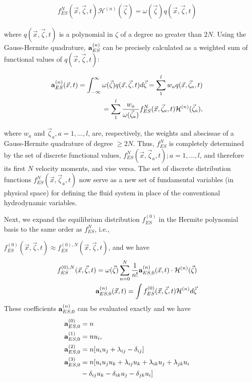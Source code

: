 \documentclass[doublecol]{epl2}
\begin{document}
\begin{align}
 f^N_{ES}(\vec x,\vec \zeta ,t) {{\mathcal H}}^{(n)}(\vec \zeta )=\omega (\vec \zeta ) q(\vec x,\vec \zeta, t)
\end{align}

where $q(\vec x,\vec \zeta,t)$ is a polynomial in $\zeta$ of a degree no greater than $2N$. Using the Gauss-Hermite quadrature,
${\bf a}^{(n)}_{ES}$ can be precisely calculated as a weighted sum of functional values of $q(\vec x,\vec \zeta,t)$:

\begin{eqnarray}
{\bf a}^{(n)}_{ES} (\vec x,t) = \int _{-\infty }^{\infty } \omega (\vec \zeta ) q(\vec x,\vec \zeta ,t) d\vec\zeta = \sum_1^l w_a q(\vec x,\vec \zeta_a ,t) \nonumber \\ 
= \sum_1^l {w_a \over \omega (\vec\zeta_a )} f^N_{ES}(\vec x,\vec \zeta_a ,t) {{\mathcal H}}^{(n)} (\vec\zeta_a ),
\end{eqnarray}

where $w_a$ and $\vec \zeta_a, a=1,...,l$, are, respectively, the weights and abscissae of a Gauss-Hermite quadrature of degree $ \ge 2N$.
Thus, $f^N_{ES}$ is completely determined by the set of discrete functional values, ${f^N_{ES}(\vec x,\vec \zeta_a ,t); a =1,...,l}$, and therefore its first $N$ velocity moments, and vise versa.  The set of discrete distribution functions $f^N_{ES}(\vec x,\vec \zeta_a ,t)$ now serve as a new set of fundamental variables (in physical space) for defining the fluid system in place of the conventional hydrodynamic variables.

Next, we expand the equilibrium distribution $f^{(0)}_{ES}$ in the Hermite polynomial basis to the same order as $f^N_{ES}$, i.e.,

$f^{(0)}_{ES}(\vec x,\vec\zeta ,t) \approx f^{(0),N}_{ES}(\vec x,\vec\zeta ,t)$, and we have
\begin{align}
 f^{(0),N}_{ES}(\vec x,\vec\zeta ,t) =\omega (\vec\zeta )\sum_{n=0}^N \frac{1}{n!}  {\bf a}^{(n)}_{ES,0} (\vec x,t) \cdot {{\mathcal H}}^{(n)}
(\vec\zeta ) \\
{\bf a}^{(n)}_{ES,0} (\vec x,t)=\int f^{(0)}_{ES}(\vec x,\vec\zeta ,t) {{\mathcal H}}^{(n)} d\vec\zeta
\end{align}
These coefficients ${\bf a}^{(n)}_{ES,0}$ can be evaluated exactly and
we have
\begin{subequations}
\begin{align}
{\bf a}_{ES,0}^{(0)} &= n \\ %
{\bf a}_{ES,0}^{(1)} &= n u_{i},  \\
{\bf a}_{ES,0}^{(2)} &= n [u_{i} u_{j} + \lambda_{i j} - \delta_{i j}] \\
{\bf a}_{ES,0}^{(3)} &= n [u_{i} u_{j} u_{k} + \lambda_{i j} u_{k} + \lambda_{i k} u_{j} + \lambda_{j k} u_{i} \nonumber \\
																					 & - \delta_{i j} u_{k}  - \delta_{i k} u_{j}  - \delta_{j k} u_{i} ] 
\end{align}
\end{subequations}
\end{document}
